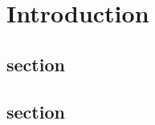 \renewcommand{\publ}{}


\chapter{Introduction}
\label{chapter:1}
\section{section}

\section{section}